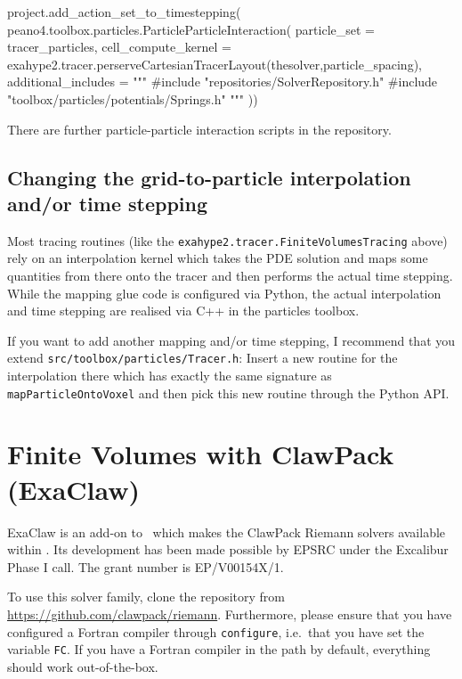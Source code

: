 \begin{code}
project.add_action_set_to_timestepping( peano4.toolbox.particles.ParticleParticleInteraction(
  particle_set = tracer_particles,
  cell_compute_kernel = exahype2.tracer.perserveCartesianTracerLayout(thesolver,particle_spacing),
  additional_includes = """
#include "repositories/SolverRepository.h"
#include "toolbox/particles/potentials/Springs.h"
"""
))
\end{code}

\noindent
There are further particle-particle interaction scripts in the repository.


\subsection{Changing the grid-to-particle interpolation and/or time stepping}

Most tracing routines (like the \texttt{exahype2.tracer.FiniteVolumesTracing}
above) rely on an interpolation kernel which takes the PDE solution and maps 
some quantities from there onto the tracer and then performs the actual time
stepping.
While the mapping glue code is configured via Python, the actual interpolation
and time stepping are realised via C++ in the particles toolbox.


If you want to add another mapping and/or time stepping, I recommend that you 
extend \texttt{src/toolbox/particles/Tracer.h}:
Insert a new routine for the interpolation there which has exactly the same
signature as \texttt{mapParticleOntoVoxel} and then pick this new routine
through the Python API.


\section{Finite Volumes with ClawPack (ExaClaw)}

ExaClaw is an add-on to \ExaHyPE\ which makes
the ClawPack Riemann solvers available within \ExaHyPE.
Its development has been made possible by EPSRC under the Excalibur
Phase I call.
The grant number is EP/V00154X/1.



To use this solver family, clone the repository from
\url{https://github.com/clawpack/riemann}.
Furthermore, please ensure that you have configured a Fortran compiler through
\texttt{configure}, i.e.~that you have set the variable \texttt{FC}.
If you have a Fortran compiler in the path by default, everything should work
out-of-the-box.

